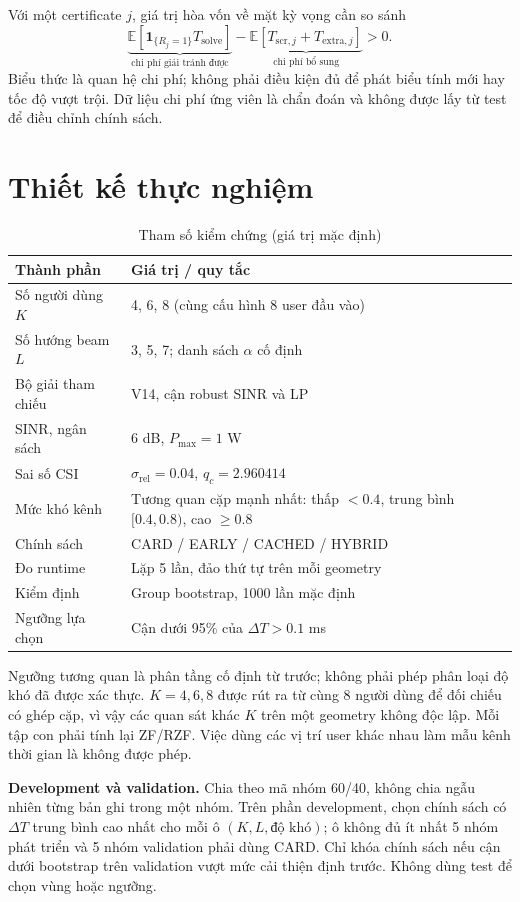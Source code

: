 \documentclass[11pt,onecolumn]{IEEEtran}
\begin{document}
Với một certificate $j$, giá trị hòa vốn về mặt kỳ vọng cần so sánh
\begin{equation}
 \underbrace{\mathbb E[\mathbf1_{\{R_j=1\}}T_{\mathrm{solve}}]}_{\text{chi phí giải tránh được}}
 -\underbrace{\mathbb E[T_{\mathrm{scr},j}+T_{\mathrm{extra},j}]}_{\text{chi phí bổ sung}}>0.
\end{equation}
Biểu thức là quan hệ chi phí; không phải điều kiện đủ để phát biểu tính mới hay tốc độ vượt trội. Dữ liệu chi phí ứng viên là chẩn đoán và không được lấy từ test để điều chỉnh chính sách.

\section{Thiết kế thực nghiệm}
\begin{table}[ht]
\centering\caption{Tham số kiểm chứng (giá trị mặc định)}
\begin{tabular}{p{.42\linewidth}p{.48\linewidth}}\toprule
Thành phần & Giá trị / quy tắc\\\midrule
Số người dùng $K$ & 4, 6, 8 (cùng cấu hình 8 user đầu vào)\\
Số hướng beam $L$ & 3, 5, 7; danh sách $\alpha$ cố định\\
Bộ giải tham chiếu & V14, cận robust SINR và LP\\
SINR, ngân sách & 6 dB, $P_{\max}=1$ W\\
Sai số CSI & $\sigma_{\mathrm{rel}}=0.04$, $q_c=2.960414$\\
Mức khó kênh & Tương quan cặp mạnh nhất: thấp $<0.4$, trung bình $[0.4,0.8)$, cao $\ge0.8$\\
Chính sách & CARD / EARLY / CACHED / HYBRID\\
Đo runtime & Lặp 5 lần, đảo thứ tự trên mỗi geometry\\
Kiểm định & Group bootstrap, 1000 lần mặc định\\
Ngưỡng lựa chọn & Cận dưới 95\% của $\Delta T>0.1$ ms\\\bottomrule
\end{tabular}
\end{table}

Ngưỡng tương quan là phân tầng cố định từ trước; không phải phép phân loại độ khó đã được xác thực. $K=4,6,8$ được rút ra từ cùng 8 người dùng để đối chiếu có ghép cặp, vì vậy các quan sát khác $K$ trên một geometry không độc lập. Mỗi tập con phải tính lại ZF/RZF. Việc dùng các vị trí user khác nhau làm mẫu kênh thời gian là không được phép.

\textbf{Development và validation.} Chia theo mã nhóm 60/40, không chia ngẫu nhiên từng bản ghi trong một nhóm. Trên phần development, chọn chính sách có $\Delta T$ trung bình cao nhất cho mỗi ô $(K,L,\text{độ khó})$; ô không đủ ít nhất 5 nhóm phát triển và 5 nhóm validation phải dùng CARD. Chỉ khóa chính sách nếu cận dưới bootstrap trên validation vượt mức cải thiện định trước. Không dùng test để chọn vùng hoặc ngưỡng.
\end{document}
